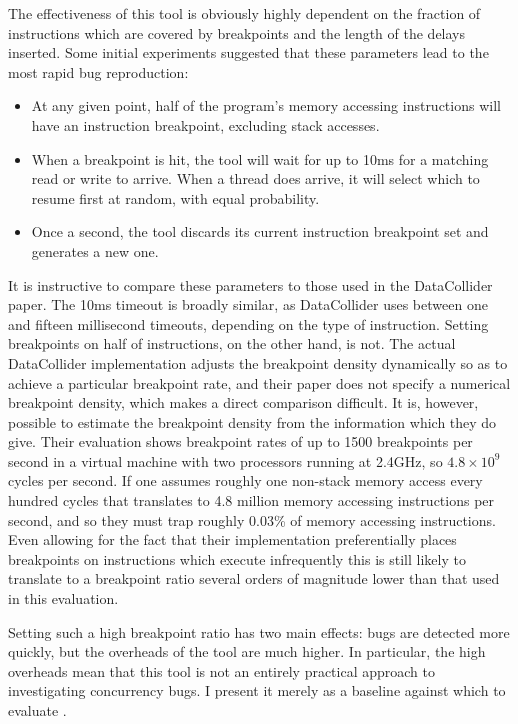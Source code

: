 The effectiveness of this tool is obviously highly dependent on the
fraction of instructions which are covered by breakpoints and the
length of the delays inserted.  Some initial experiments suggested
that these parameters lead to the most rapid bug
reproduction:

\begin{itemize}
\item
  At any given point, half of the program's memory accessing
  instructions will have an instruction breakpoint, excluding stack
  accesses.
\item
  When a breakpoint is hit, the tool will wait for up to 10ms for a
  matching read or write to arrive.  When a thread does arrive, it
  will select which to resume first at random, with equal probability.
\item
  Once a second, the tool discards its current instruction breakpoint
  set and generates a new one.
\end{itemize}

It is instructive to compare these parameters to those used in the
DataCollider paper.  The 10ms timeout is broadly similar, as
DataCollider uses between one and fifteen millisecond timeouts,
depending on the type of instruction.  Setting breakpoints on half of
instructions, on the other hand, is not.  The actual DataCollider
implementation adjusts the breakpoint density dynamically so as to
achieve a particular breakpoint rate, and their paper does not specify
a numerical breakpoint density, which makes a direct comparison
difficult.  It is, however, possible to estimate the breakpoint
density from the information which they do give.  Their evaluation
shows breakpoint rates of up to 1500 breakpoints per second in a
virtual machine with two processors running at 2.4GHz, so $4.8 \times
10^9$ cycles per second.  If one assumes roughly one non-stack memory
access every hundred cycles that translates to 4.8 million memory
accessing instructions per second, and so they must trap roughly
0.03\% of memory accessing instructions.  Even allowing for the fact
that their implementation preferentially places breakpoints on
instructions which execute infrequently this is still likely to
translate to a breakpoint ratio several orders of magnitude lower than
that used in this evaluation.

Setting such a high breakpoint ratio has two main effects: bugs are
detected more quickly, but the overheads of the tool are much higher.
In particular, the high overheads mean that this tool is not an
entirely practical approach to investigating concurrency bugs.  I
present it merely as a baseline against which to evaluate
{\implementation}.  

